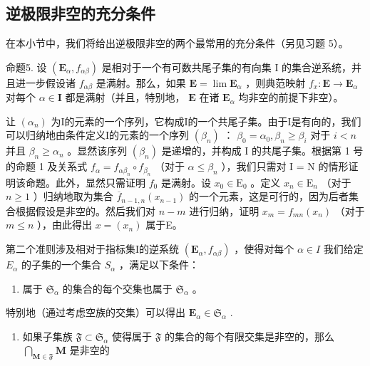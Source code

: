 \subsection{逆极限非空的充分条件}

在本小节中，我们将给出逆极限非空的两个最常用的充分条件（另见习题 5）。

命题5. 设 \((\mathbf{E}_{\alpha}, f_{\alpha \beta})\) 是相对于一个有可数共尾子集的有向集 I 的集合逆系统，并且进一步假设诸 \(f_{\alpha \beta}\) 是满射。那么，如果 \(\mathbf{E} = \lim \mathbf{E}_{\alpha}\) ，则典范映射 \(f_{x}: \mathbf{E} \to \mathbf{E}_{\alpha}\) 对每个 \(\alpha \in \mathbf{I}\) 都是满射（并且，特别地， \(\mathbf{E}\) 在诸 \(\mathbf{E}_{\alpha}\) 均非空的前提下非空）。

让 \((\alpha_{n})\) 为I的元素的一个序列，它构成I的一个共尾子集。由于I是有向的，我们可以归纳地由条件定义I的元素的一个序列 \((\beta_{n})\) ： \(\beta_{0} = \alpha_{0}, \beta_{n} \geqslant \beta_{i}\) 对于 \(i < n\) 并且 \(\beta_{n} \geqslant \alpha_{n}\) 。显然该序列 \((\beta_{n})\) 是递增的，并构成 I 的共尾子集。根据第 1 号的命题 1 及关系式 \(f_{\alpha} = f_{\alpha \beta_{n}} \circ f_{\beta_{n}}\) （对于 \(\alpha \leqslant \beta_{n}\) ），我们只需对 I = N 的情形证明该命题。此外，显然只需证明 \(f_{0}\) 是满射。设 \(x_{0} \in \mathrm{E}_{0}\) 。定义 \(x_{n} \in \mathrm{E}_{n}\) （对于 \(n \geqslant 1\) ）归纳地取为集合 \(\overline{f}_{n-1,n}(x_{n-1})\) 的一个元素，这是可行的，因为后者集合根据假设是非空的。然后我们对 \(n - m\) 进行归纳，证明 \(x_{m} = f_{mn}(x_{n})\) （对于 \(m \leqslant n\) ），由此得出 \(x = (x_{n})\) 属于E。

第二个准则涉及相对于指标集I的逆系统 \((\mathbf{E}_{\alpha}, f_{\alpha\beta})\) ，使得对每个 \(\alpha \in I\) 我们给定 \(E_{\alpha}\) 的子集的一个集合 \(S_{\alpha}\) ，满足以下条件：

\begin{enumerate}
\def\labelenumi{(\roman{enumi})}
\tightlist
\item
  属于 \(\mathfrak{S}_{\alpha}\) 的集合的每个交集也属于 \(\mathfrak{S}_{\alpha}\) 。
\end{enumerate}

特别地（通过考虑空族的交集）可以得出 \(\mathbf{E}_{\alpha} \in \mathfrak{S}_{\alpha}\) .

\begin{enumerate}
\def\labelenumi{(\roman{enumi})}
\setcounter{enumi}{1}
\tightlist
\item
  如果子集族 \(\mathfrak{F} \subset \mathfrak{S}_{\alpha}\) 使得属于 \(\mathfrak{F}\) 的集合的每个有限交集是非空的，那么 \(\bigcap_{\mathbf{M} \in \mathfrak{F}} \mathbf{M}\) 是非空的
\end{enumerate}

